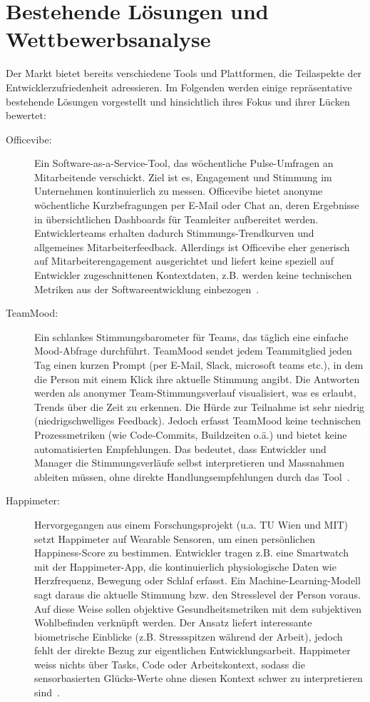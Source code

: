 \documentclass[12pt,a4paper]{report}
\begin{document}
\section{Bestehende Lösungen und Wettbewerbsanalyse}

Der Markt bietet bereits verschiedene Tools und Plattformen, die Teilaspekte der Entwicklerzufriedenheit adressieren. Im Folgenden
werden einige repräsentative bestehende Lösungen vorgestellt und hinsichtlich ihres Fokus und ihrer Lücken bewertet:

\begin{description}
  \item[Officevibe:] Ein Software-as-a-Service-Tool, das wöchentliche Pulse-Umfragen an Mitarbeitende verschickt. Ziel ist es,
    Engagement und Stimmung im Unternehmen kontinuierlich zu messen. Officevibe bietet anonyme wöchentliche Kurzbefragungen per
    E-Mail oder Chat an, deren Ergebnisse in übersichtlichen Dashboards für Teamleiter aufbereitet werden. Entwicklerteams erhalten
    dadurch Stimmungs-Trendkurven und allgemeines Mitarbeiterfeedback. Allerdings ist Officevibe eher generisch auf
    Mitarbeiterengagement ausgerichtet und liefert keine speziell auf Entwickler zugeschnittenen Kontextdaten, z.B. werden keine
    technischen Metriken aus der Softwareentwicklung einbezogen~\cite{courier_officevibe_2025}.

  \item[TeamMood:] Ein schlankes Stimmungsbarometer für Teams, das täglich eine einfache Mood-Abfrage durchführt. TeamMood sendet
    jedem Teammitglied jeden Tag einen kurzen Prompt (per E-Mail, Slack, microsoft teams etc.), in dem die Person mit einem Klick
    ihre aktuelle Stimmung angibt. Die Antworten werden als anonymer Team-Stimmungsverlauf visualisiert, was es erlaubt, Trends über
    die Zeit zu erkennen. Die Hürde zur Teilnahme ist sehr niedrig (niedrigschwelliges Feedback). Jedoch erfasst TeamMood keine
    technischen Prozessmetriken (wie Code-Commits, Buildzeiten o.ä.) und bietet keine automatisierten Empfehlungen. Das bedeutet,
    dass Entwickler und Manager die Stimmungsverläufe selbst interpretieren und Massnahmen ableiten müssen, ohne direkte
    Handlungsempfehlungen durch das Tool~\cite{revelo_teammood_2025}.

  \item[Happimeter:] Hervorgegangen aus einem Forschungsprojekt (u.a. TU Wien und MIT) setzt Happimeter auf Wearable Sensoren, um
    einen persönlichen Happiness-Score zu bestimmen. Entwickler tragen z.B. eine Smartwatch mit der Happimeter-App, die
    kontinuierlich physiologische Daten wie Herzfrequenz, Bewegung oder Schlaf erfasst. Ein Machine-Learning-Modell sagt daraus
    die aktuelle Stimmung bzw. den Stresslevel der Person voraus. Auf diese Weise sollen objektive Gesundheitsmetriken mit dem
    subjektiven Wohlbefinden verknüpft werden. Der Ansatz liefert interessante biometrische Einblicke (z.B. Stressspitzen während
    der Arbeit), jedoch fehlt der direkte Bezug zur eigentlichen Entwicklungsarbeit. Happimeter weiss nichts über Tasks, Code oder
    Arbeitskontext, sodass die sensorbasierten Glücks-Werte ohne diesen Kontext schwer zu interpretieren sind~\cite{budner_making_2017}.


\end{description}
\end{document}
